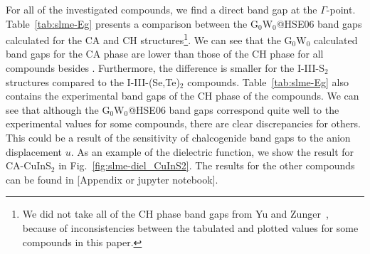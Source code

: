 \begin{refsection}
For all of the investigated compounds, we find a direct band gap at the $\Gamma$-point. Table~\ref{tab:slme-Eg} presents a comparison between the G$_0$W$_0$@HSE06 band gaps calculated for the CA and CH structures\footnote[4]{We did not take all of the CH phase band gaps from Yu and Zunger~\cite{Yu2012}, because of inconsistencies between the tabulated and plotted values for some compounds in this paper.}. We can see that the G$_0$W$_0$ calculated band gaps for the CA phase are lower than those of the CH phase for all compounds besides . Furthermore, the difference is smaller for the \mbox{I-III-S$_2$} structures compared to the \mbox{I-III-(Se,Te)$_2$} compounds. Table~\ref{tab:slme-Eg} also contains the experimental band gaps of the CH phase of the compounds. We can see that although the G$_0$W$_0$@HSE06 band gaps correspond quite well to the experimental values for some compounds, there are clear discrepancies for others. This could be a result of the sensitivity of chalcogenide band gaps to the anion displacement $u$. As an example of the dielectric function, we show the result for \mbox{CA-CuInS$_2$} in Fig.~\ref{fig:slme-diel_CuInS2}. The results for the other compounds can be found in [Appendix or jupyter notebook].



\end{refsection}
